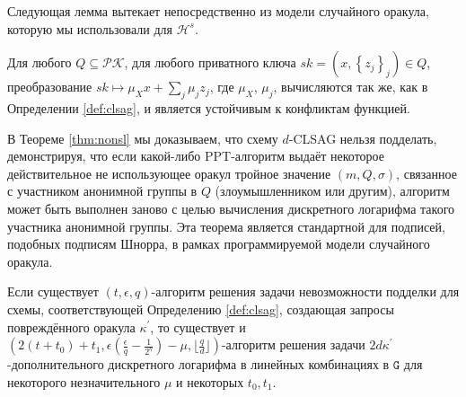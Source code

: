 \documentclass{llncs}
\newcommand{\G}{\texttt{G}}
\newcommand{\Hs}{\mathcal{H}^s}
\begin{document}
Следующая лемма вытекает непосредственно из модели случайного оракула, которую мы использовали для $\Hs$.

\begin{lemma}
Для любого $Q \subseteq \mathcal{PK}$, для любого приватного ключа \linebreak $sk = (x, \left\{z_j\right\}_j) \in Q$, преобразование $sk \mapsto \mu_X x + \sum_j \mu_j z_j$, где $\mu_X$, $\mu_j$, вычисляются так же, как в Определении \ref{def:clsag}, и является устойчивым к конфликтам функцией.
\end{lemma}

В Теореме \ref{thm:nonsl} мы доказываем, что схему $d$-CLSAG нельзя подделать, демонстрируя, что если какой-либо PPT-алгоритм выдаёт некоторое действительное не использующее оракул тройное значение $(m, Q, \sigma)$, связанное с участником анонимной группы в $Q$ (злоумышленником или другим), алгоритм может быть выполнен заново с целью вычисления дискретного логарифма такого участника анонимной группы. Эта теорема является стандартной для подписей, подобных подписям Шнорра, в рамках программируемой модели случайного оракула.

\begin{theorem} \label{thm:nonsl}
Если существует $(t, \epsilon, q)$-алгоритм решения задачи невозможности подделки для схемы, соответствующей Определению \ref{def:clsag}, создающая запросы повреждённого оракула $\kappa^\prime$, то существует и $(2(t+t_0) + t_1, \epsilon\left(\frac{\epsilon}{q} - \frac{1}{2^\eta}\right) - \mu, \lfloor \frac{q}{d}\rfloor)$-алгоритм решения задачи $2d\kappa^\prime$-дополнительного дискретного логарифма в линейных комбинациях в $\G$ для некоторого незначительного $\mu$ и некоторых $t_0, t_1$.
\end{theorem}
\end{document}
